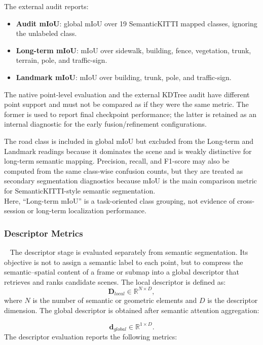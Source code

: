 The external audit reports:
\begin{itemize}
    \item \textbf{Audit mIoU}: global mIoU over 19 SemanticKITTI mapped classes, ignoring the unlabeled class.
    \item \textbf{Long-term mIoU}: mIoU over sidewalk, building, fence, vegetation, trunk, terrain, pole, and traffic-sign.
    \item \textbf{Landmark mIoU}: mIoU over building, trunk, pole, and traffic-sign.
\end{itemize}

The native point-level evaluation and the external KDTree audit have different point support and must not be compared as if they were the same metric. The former is used to report final checkpoint performance; the latter is retained as an internal diagnostic for the early fusion/refinement configurations.

The road class is included in global mIoU but excluded from the Long-term and Landmark readings because it dominates the scene and is weakly distinctive for long-term semantic mapping. Precision, recall, and F1-score may also be computed from the same class-wise confusion counts, but they are treated as secondary segmentation diagnostics because mIoU is the main comparison metric for SemanticKITTI-style semantic segmentation. \\
Here, ``Long-term mIoU'' is a task-oriented class grouping, not evidence of cross-session or long-term localization performance.

\subsubsection{Descriptor Metrics}~\label{subsubsec:descriptor-metrics}
The descriptor stage is evaluated separately from semantic segmentation. Its objective is not to assign a semantic label to each point, but to compress the semantic--spatial content of a frame or submap into a global descriptor that retrieves and ranks candidate scenes.
The local descriptor is defined as:
\begin{equation}
    \mathbf{D}_{local} \in \mathbb{R}^{N \times D},
\end{equation}
where $N$ is the number of semantic or geometric elements and $D$ is the descriptor dimension. The global descriptor is obtained after semantic attention aggregation:

\begin{equation}
    \mathbf{d}_{global} \in \mathbb{R}^{1 \times D}.
\end{equation}
The descriptor evaluation reports the following metrics:

